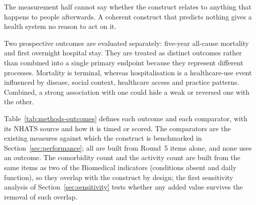 The measurement half cannot say whether the construct relates to anything that happens to people afterwards. A coherent construct that predicts nothing gives a health system no reason to act on it.

Two prospective outcomes are evaluated separately: five-year all-cause mortality and first overnight hospital stay. They are treated as distinct outcomes rather than combined into a single primary endpoint because they represent different processes. Mortality is terminal, whereas hospitalisation is a healthcare-use event influenced by disease, social context, healthcare access and practice patterns. Combined, a strong association with one could hide a weak or reversed one with the other.

Table~\ref{tab:methods-outcomes} defines each outcome and each comparator, with its NHATS source and how it is timed or scored. The comparators are the existing measures against which the construct is benchmarked in Section~\ref{sec:performance}; all are built from Round~5 items alone, and none uses an outcome. The comorbidity count and the activity count are built from the same items as two of the Biomedical indicators (conditions absent and daily function), so they overlap with the construct by design; the first sensitivity analysis of Section~\ref{sec:sensitivity} tests whether any added value survives the removal of such overlap.

